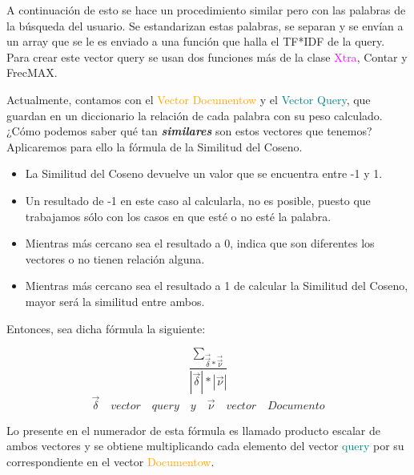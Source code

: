 \documentclass{beamer}
\begin{document}
\begin{frame}
    
\Large A continuación de esto se hace un procedimiento similar pero con las palabras de la búsqueda del usuario. Se estandarizan estas palabras, se separan y se envían a un array que se le es enviado a una función que halla el TF*IDF de la query.
Para crear este vector query se usan dos funciones más de la clase \textcolor{magenta}{Xtra}, Contar y FrecMAX.


\end{frame}




\begin{frame}[fragile]

\Large Actualmente, contamos con el \textcolor{orange}{Vector Documentow} y el \textcolor{teal}{Vector Query}, que guardan en un diccionario la relación de cada palabra con su peso calculado. ¿Cómo podemos saber qué tan \textbf{\emph{similares}} son estos vectores que tenemos?
Aplicaremos para ello la fórmula de la Similitud del Coseno.
\begin{itemize}
    \item La Similitud del Coseno devuelve un valor que se encuentra entre -1 y 1.
    \item Un  resultado de -1 en este caso al calcularla, no es posible, puesto que trabajamos sólo con los casos en que esté o no esté la palabra.

\end{itemize}

    
\end{frame}

\begin{frame}
\begin{itemize}
    \item \Large Mientras más cercano sea el resultado a 0, indica que son diferentes los vectores o no tienen relación alguna.
    \item Mientras más cercano sea el resultado a 1 de calcular la Similitud del Coseno, mayor será la similitud entre ambos.
\end{itemize}    

Entonces, sea dicha fórmula la siguiente:

\begin{equation}
    \frac{\sum_{\vec{\vec{\delta}}  *  \vec{\vec{\nu}} } } {|\vec{\delta} | * |\vec{\nu} |} 
\end{equation}
\begin{equation}\vec{\delta}\quad vector\quad query\quad y\quad \vec{\nu}\quad vector\quad Documento \end{equation}

Lo presente en el numerador de esta fórmula es llamado producto escalar de ambos vectores y se obtiene multiplicando cada elemento del vector \textcolor{teal}{query} por su correspondiente en el vector \textcolor{orange}{Documentow}. 


\end{frame}
\end{document}
